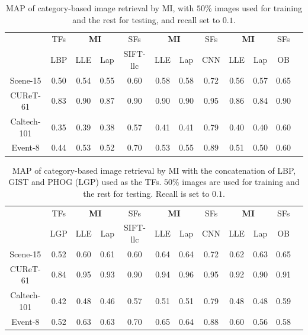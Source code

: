 \begin{table}[!tb]
  \centering \small    \setlength{\tabcolsep}{.60em} 
  \caption{MAP of category-based image retrieval by MI, with $50\%$ images used for training and the rest for testing, and recall set to $0.1$.}
  \begin{tabular}{c|c|ccc|ccc|cccc}
   & TFs & \multicolumn{2}{c}{\textbf{MI}} & SFs & \multicolumn{2}{c}{ \textbf{MI} } & SFs & \multicolumn{2}{c}{ \textbf{MI}} & SFs  \\   
    & LBP & LLE & Lap & SIFT-llc  & LLE & Lap & CNN &  LLE & Lap & OB     \\   \hline  
   Scene-15  & 0.50  & 0.54  & 0.55  & 0.60   & 0.58  & 0.58  & 0.72   & 0.56  & 0.57  & 0.65 \\   
   CUReT-61  & 0.83  & 0.90  & 0.87  & 0.90  & 0.90  & 0.90  & 0.95 & 0.86  & 0.84  & 0.90 \\ 
   Caltech-101  & 0.35  & 0.39  & 0.38  & 0.57  & 0.41  & 0.41  & 0.79  & 0.40  & 0.40  & 0.60 \\  
   Event-8 & 0.44  & 0.53  & 0.52  & 0.70    & 0.53  & 0.55  & 0.89    & 0.51  & 0.50  & 0.60 \\   
  \end{tabular}
  \label{tab:class:retreval} 
\end{table}




 \begin{table}[!tb]
   \centering \small  \setlength{\tabcolsep}{.60em} 
\caption{MAP of category-based image retrieval by MI with the concatenation of LBP, GIST and PHOG (LGP) used as the TFs. 
    $50\%$ images are used for training and the rest for testing. Recall is set to $0.1$.}
  \begin{tabular}{c|c|ccc|ccc|cccc}
   & TFs & \multicolumn{2}{c}{\textbf{MI}} & SFs & \multicolumn{2}{c}{ \textbf{MI} } & SFs & \multicolumn{2}{c}{ \textbf{MI}} & SFs  \\   
    & LGP & LLE & Lap & SIFT-llc  & LLE & Lap & CNN &  LLE & Lap & OB     \\   \hline  
      Scene-15 & 0.52  & 0.60  & 0.61  & 0.60   & 0.64  & 0.64  & 0.72   & 0.62  & 0.63  & 0.65 \\ 
      CUReT-61 & 0.84  & 0.95  & 0.93  & 0.90    & 0.94  & 0.96  & 0.95    & 0.92  & 0.90  & 0.91 \\ 
      Caltech-101 & 0.42  & 0.48  & 0.46  & 0.57   & 0.51  & 0.51  & 0.79  & 0.48  & 0.48  & 0.59 \\ 
     Event-8 & 0.52  & 0.63  & 0.63  & 0.70  & 0.65  & 0.64  & 0.88   & 0.60  & 0.56  & 0.58 \\    
  \end{tabular}
     \label{tab:alltf}
 \end{table}


